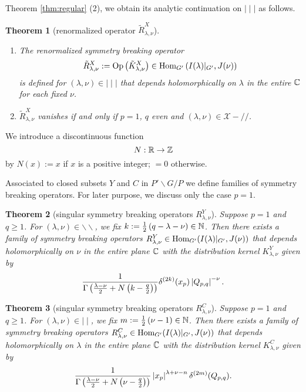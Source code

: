 \documentclass[reqno,12pt]{pja00} %
\newtheorem{theorem}{Theorem}[section]
\newcommand{\Hom}{\mbox{\normalfont Hom}}
\theoremstyle{definition}
\theoremstyle{exampstyle} \newtheorem{examp}[theorem]{Theorem}
\newcommand{\Op}{\mbox{\normalfont Op}}
\renewcommand{\Q}{Q_{p,q}}
\let\setminus-
\begin{document}
Theorem \ref{thm:regular} (2), we obtain its analytic continuation on $\mid\mid\mid$ as follows.\begin{theorem}[renormalized operator $\tilde{R}_{\lambda,\nu}^X$]
	\begin{enumerate}[(1)]
		\item The renormalized symmetry breaking operator\begin{equation*}
				\tilde{R}_{\lambda,\nu}^X:=\Op\left( \tilde{K}_{\lambda,\nu}^X \right)\in\Hom_{G'}\left( I(\lambda)\kern-0.1cm\mid_{G'},J(\nu) \right)
			\end{equation*}is defined for $(\lambda,\nu)\in\mid\mid\mid$ that depends holomorphically 
			on $\lambda$ in the entire $\mathbb{C}$ for each fixed $\nu$.
		\item $\tilde{R}^X_{\lambda,\nu}$ vanishes if and only if $p=1$, $q$ even and $(\lambda,\nu)\in\mathcal{X}\setminus//$.
	\end{enumerate}
	\label{thm:X2}
\end{theorem}

We introduce a discontinuous function\begin{equation*}
	N:\R\to\Z
\end{equation*}by $N(x):=x$ if $x$ is a positive integer; $=0$ otherwise.

Associated to closed subsets $Y$ and $C$ in $P'\backslash G/P$ we define families of symmetry breaking operators. For later purpose, we discuss only the case $p=1$.
\begin{theorem}[singular symmetry breaking operators $R_{\lambda,\nu}^Y$]\label{thm:singY}
	Suppose $p=1$ and $q\ge1$. For $(\lambda,\nu)\in\backslash\backslash$, we fix $k:=\frac{1}{2}\left( q-\lambda-\nu \right)\in\mathbb{N}$. Then there exists a family of symmetry breaking operators
	$R_{\lambda,\nu}^Y\in\Hom_{G'}(I(\lambda)\kern-0.1cm\mid_{G'},J(\nu))$ that depends holomorphically on $\nu$ in the entire plane $\mathbb{C}$ with the distribution kernel $K_{\lambda,\nu}^Y$ given by\begin{equation*}
		\frac{1}{\Gamma\left( \frac{\lambda-\nu}{2}+N\left( k-\frac{q}{2} \right) \right)}\delta^{(2k)}(x_p)\myabs{\Q}^{-\nu}.
	\end{equation*}
\end{theorem}
\begin{theorem}[singular symmetry breaking operators $R_{\lambda,\nu}^C$]\label{thm:singC}
	Suppose $p=1$ and $q\ge1$. For $(\lambda,\nu)\in\mid\mid$, we fix $m:=\frac{1}{2}\left(\nu-1 \right)\in\mathbb{N}$. Then there exists a family of symmetry breaking operators
	$R_{\lambda,\nu}^C\in\Hom_{G'}(I(\lambda)\kern-0.1cm\mid_{G'},J(\nu))$ that depends holomorphically on $\lambda$ in the entire plane $\mathbb{C}$ with the distribution kernel $K_{\lambda,\nu}^C$ given by
	\begin{equation*}
	\frac{1}{\Gamma\left( \frac{\lambda-\nu}{2}+N\left(\nu- \frac{q}{2} \right) \right)}\myabs{x_p}^{\lambda+\nu-n}\delta^{(2m)}(\Q).
	\end{equation*}
\end{theorem}
\end{document}
